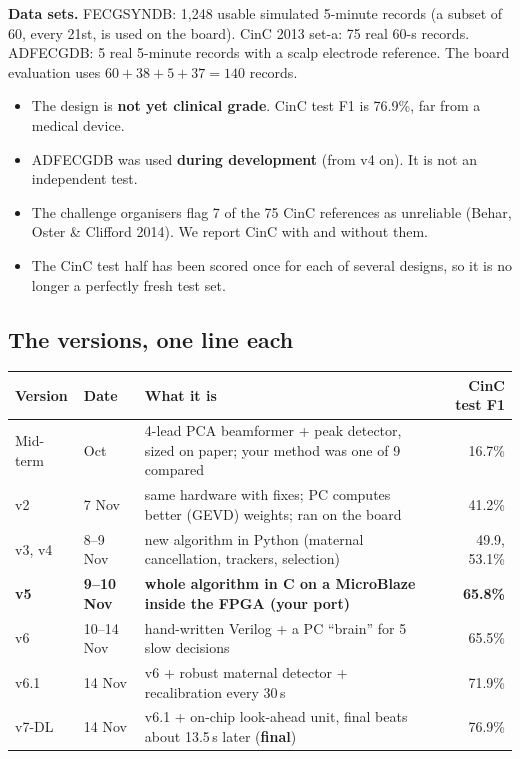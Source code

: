 \documentclass[11pt]{article}
\begin{document}
\textbf{Data sets.} FECGSYNDB: 1,248 usable simulated 5-minute records (a subset of 60, every 21st, is used on the board). CinC 2013 set-a: 75 real 60-s records. ADFECGDB: 5 real 5-minute records with a scalp electrode reference. The board evaluation uses $60+38+5+37 = 140$ records.

\begin{warn}
\begin{itemize}
  \item The design is \textbf{not yet clinical grade}. CinC test F1 is 76.9\%, far from a medical device.
  \item ADFECGDB was used \textbf{during development} (from v4 on). It is not an independent test.
  \item The challenge organisers flag 7 of the 75 CinC references as unreliable (Behar, Oster \& Clifford 2014). We report CinC with and without them.
  \item The CinC test half has been scored once for each of several designs, so it is no longer a perfectly fresh test set.
\end{itemize}
\end{warn}

\subsection{The versions, one line each}

\begin{center}
\small
\begin{tabularx}{\linewidth}{@{}l l X r@{}}
\toprule
\textbf{Version} & \textbf{Date} & \textbf{What it is} & \textbf{CinC test F1} \\
\midrule
Mid-term & Oct & 4-lead PCA beamformer + peak detector, sized on paper; your method was one of 9 compared & 16.7\% \\
v2 & 7 Nov & same hardware with fixes; PC computes better (GEVD) weights; ran on the board & 41.2\% \\
v3, v4 & 8--9 Nov & new algorithm in Python (maternal cancellation, trackers, selection) & 49.9, 53.1\% \\
\textbf{v5} & \textbf{9--10 Nov} & \textbf{whole algorithm in C on a MicroBlaze inside the FPGA (your port)} & \textbf{65.8\%} \\
v6 & 10--14 Nov & hand-written Verilog + a PC ``brain'' for 5 slow decisions & 65.5\% \\
v6.1 & 14 Nov & v6 + robust maternal detector + recalibration every 30\,s & 71.9\% \\
v7-DL & 14 Nov & v6.1 + on-chip look-ahead unit, final beats about 13.5\,s later (\textbf{final}) & 76.9\% \\
\bottomrule
\end{tabularx}
\end{center}
\end{document}
